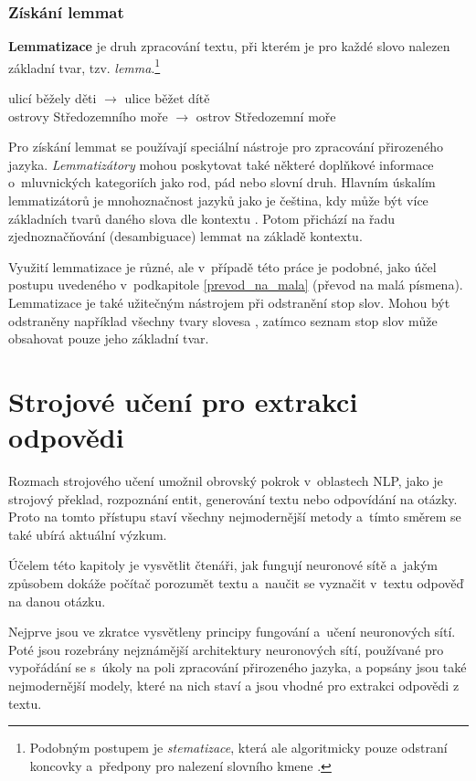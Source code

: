 \subsection{Získání lemmat}
\textbf{Lemmatizace} je druh zpracování textu, při kterém je pro každé slovo nalezen základní tvar, tzv. \emph{lemma}.\footnote{Podobným postupem je \emph{stematizace}, která ale algoritmicky pouze odstraní koncovky a~předpony pro nalezení slovního kmene \cite{information_retrieval}.}
\begin{center}
    ulicí běžely děti $\longrightarrow$ ulice běžet dítě\\
    ostrovy Středozemního moře $\longrightarrow$ ostrov Středozemní moře
\end{center}
Pro získání lemmat se používají speciální nástroje pro zpracování přirozeného jazyka. \emph{Lemma\-tizátory} mohou poskytovat také některé doplňkové informace o~mluvnických kategoriích jako rod, pád nebo slovní druh. Hlavním úskalím lemmatizátorů je mnohoznačnost jazyků jako je čeština, kdy může být více základních tvarů daného slova dle kontextu \cite{information_retrieval}. Potom přichází na řadu zjednoznačňování (desambiguace) lemmat na základě kontextu.\par
Využití lemmatizace je různé, ale v~případě této práce je podobné, jako účel postupu uvedeného v~podkapitole \ref{prevod_na_mala} (převod na malá písmena). Lemmatizace je také užitečným nástrojem při odstranění stop slov. Mohou být odstraněny například všechny tvary slovesa , zatímco seznam stop slov může obsahovat pouze jeho základní tvar.



\chapter{Strojové učení pro extrakci odpovědi}
\label{language_comprehension}

Rozmach strojového učení umožnil obrovský pokrok v~oblastech NLP, jako je strojový překlad, rozpoznání entit, generování textu nebo odpovídání na otázky. Proto na tomto přístupu staví všechny nejmodernější metody a~tímto směrem se také ubírá aktuální výzkum.\par
Účelem této kapitoly je vysvětlit čtenáři, jak fungují neuronové sítě a~jakým způsobem dokáže počítač porozumět textu a~naučit se vyznačit v~textu odpověď na danou otázku.\par
Nejprve jsou ve zkratce vysvětleny principy fungování a~učení neuronových sítí. Poté jsou rozebrány nejznámější architektury neuronových sítí, používané pro vypořádání se s~úkoly na poli zpracování přirozeného jazyka, a popsány jsou také nejmodernější modely, které na nich staví a jsou vhodné pro extrakci odpovědi z textu.
\bigskip

